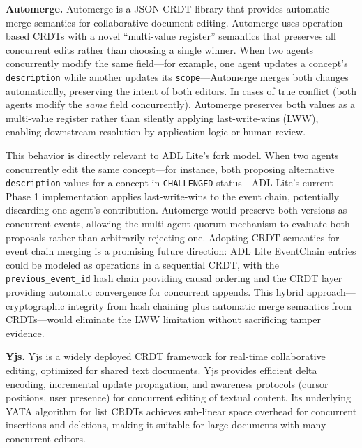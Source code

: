 \textbf{Automerge.} Automerge\cite{ref56} is a JSON CRDT library that provides automatic merge semantics for collaborative document editing. Automerge uses operation-based CRDTs with a novel ``multi-value register'' semantics that preserves all concurrent edits rather than choosing a single winner. When two agents concurrently modify the same field---for example, one agent updates a concept's \texttt{description} while another updates its \texttt{scope}---Automerge merges both changes automatically, preserving the intent of both editors. In cases of true conflict (both agents modify the \emph{same} field concurrently), Automerge preserves both values as a multi-value register rather than silently applying last-write-wins (LWW), enabling downstream resolution by application logic or human review.

This behavior is directly relevant to ADL Lite's fork model. When two agents concurrently edit the same concept---for instance, both proposing alternative \texttt{description} values for a concept in \texttt{CHALLENGED} status---ADL Lite's current Phase 1 implementation applies last-write-wins to the event chain, potentially discarding one agent's contribution. Automerge would preserve both versions as concurrent events, allowing the multi-agent quorum mechanism to evaluate both proposals rather than arbitrarily rejecting one. Adopting CRDT semantics for event chain merging is a promising future direction: ADL Lite EventChain entries could be modeled as operations in a sequential CRDT, with the \texttt{previous\_event\_id} hash chain providing causal ordering and the CRDT layer providing automatic convergence for concurrent appends. This hybrid approach---cryptographic integrity from hash chaining plus automatic merge semantics from CRDTs---would eliminate the LWW limitation without sacrificing tamper evidence.

\textbf{Yjs.} Yjs\cite{ref57} is a widely deployed CRDT framework for real-time collaborative editing, optimized for shared text documents. Yjs provides efficient delta encoding, incremental update propagation, and awareness protocols (cursor positions, user presence) for concurrent editing of textual content. Its underlying YATA algorithm\cite{ref58} for list CRDTs achieves sub-linear space overhead for concurrent insertions and deletions, making it suitable for large documents with many concurrent editors.

